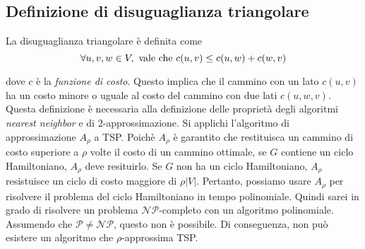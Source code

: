 \subsection{Definizione di disuguaglianza triangolare}

La disuguaglianza triangolare è definita come
\begin{equation}
\forall u, v, w \in V, \textnormal{ vale che } c(u, v) \le c(u, w) + c(w, v)
\end{equation}

dove $c$ è la \textit{funzione di costo}. Questo implica che il cammino con un lato $c(u, v)$ ha un costo
minore o uguale al costo del cammino con due lati $c(u, w, v)$. \\

Questa definizione è necessaria alla definizione delle proprietà degli algoritmi
\textit{nearest neighbor} e di 2-approssimazione.
Si applichi l'algoritmo di approssimazione $A_{\rho}$ a TSP. Poichè $A_{\rho}$ è garantito
che restituisca un cammino di costo superiore a $\rho$ volte il costo di un cammino ottimale,
se $G$ contiene un ciclo Hamiltoniano, $A_{\rho}$ deve resituirlo. Se $G$ non ha un ciclo
Hamiltoniano, $A_{\rho}$ resistuisce un ciclo di costo maggiore di $\rho |V|$.
Pertanto, possiamo usare $A_{\rho}$ per risolvere il problema del ciclo Hamiltoniano in
tempo polinomiale. Quindi sarei in grado di risolvere un problema $\mathcal{NP}$-completo
con un algoritmo polinomiale. Assumendo che $\mathcal{P} \ne \mathcal{NP}$, questo non è
possibile. Di conseguenza, non può esistere un algoritmo che $\rho$-approssima TSP.
